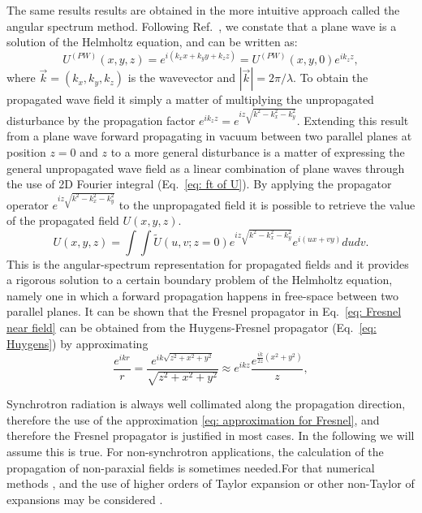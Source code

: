 \documentclass{iucr}              %
\begin{document}
The same results results are obtained in the more intuitive approach called the angular spectrum method. Following Ref.~\cite{paganin_book}, we constate that a plane wave is a solution of the Helmholtz equation, and can be written as: 
\begin{equation}
 U^{(PW)}(x,y,z)=e^{i(k_xx+k_yy+k_zz)} = U^{(PW)}(x,y,0) e^{i k_z z},
\end{equation}
where $\vec{k}=(k_x,k_y,k_z)$ is the wavevector and $|\vec{k}| = 2 \pi / \lambda$. 
To obtain the propagated wave field it simply a matter of multiplying the unpropagated disturbance by the propagation factor $e^{i k_z z} = e^{i z\sqrt{k^2 -k_x^2-k_y^2}}$. Extending this result from a plane wave forward propagating in vacuum between two parallel planes at position $z=0$ and $z$ to a more general disturbance is a matter of expressing the general unpropagated wave field as a linear combination of plane waves through the use of 2D Fourier integral (Eq.~\ref{eq: ft of U}).
By applying the propagator operator $e^{i z\sqrt{k^2 -k_x^2-k_y^2}}$ to the unpropagated field it is possible to retrieve the value of the propagated field $U(x,y,z)$. 
\begin{equation}\label{eq: angular-spectrum representation}
U(x, y, z) = \int \int \widetilde{U}(u,v; z=0) e^{i z\sqrt{k^2 -k_x^2-k_y^2}} e^{i(u x + v y)} du dv.
\end{equation} 
This is the angular-spectrum representation for propagated fields and it provides a rigorous solution to a certain boundary problem of the Helmholtz equation, namely one in which a forward propagation happens in free-space between two parallel planes. 
It can be shown that the Fresnel propagator in Eq.~\ref{eq: Fresnel near field} can be obtained from the Huygens-Fresnel propagator (Eq.~\ref{eq: Huygens}) by approximating
\begin{equation}\label{eq: approximation for Fresnel}
 \frac{e^{i k r}}{r} = \frac{e^{i k \sqrt{z^2 + x^2 + y^2} }} { \sqrt{z^2 + x^2 + y^2} } \approx e^{i k z} \frac{ 
 e^{\frac{i k}{2 z} (x^2 + y^2)} 
 }{z},  
\end{equation}

Synchrotron radiation is always well collimated along the propagation direction, therefore the use of the approximation \ref{eq: approximation for Fresnel}, and therefore the Fresnel propagator is justified in most cases. In the following we will assume this is true. For non-synchrotron applications, the calculation of the propagation of non-paraxial fields is sometimes needed.For that numerical methods \cite{Hillenbrand}, and the use of higher orders of Taylor expansion or other non-Taylor of expansions may be considered \cite{Mansuripur,Avoort}.
\end{document}

